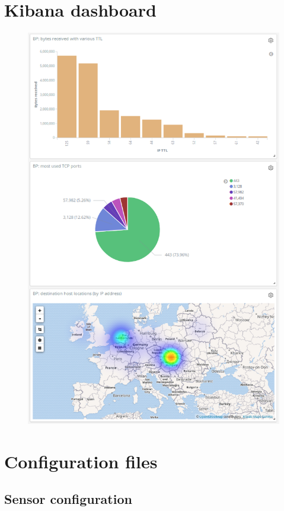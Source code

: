 \documentclass[12pt,a4paper,twoside]{book}
\begin{document}
\begin{appendices}
    \chapter{Kibana dashboard} \label{appendix:sol:dashboard}
        \begin{figure}[h]
            \centering
            \includegraphics[scale=0.38]{dashboard}
        \end{figure}
	\chapter{Configuration files}    
    	\section{Sensor configuration} \label{lst:sensor:config}
        	

\end{appendices}
\end{document}
